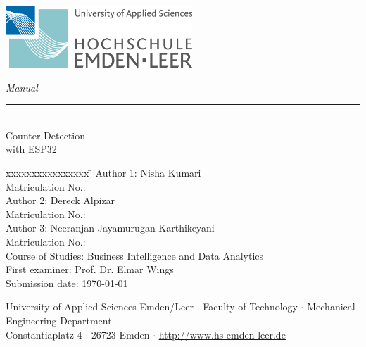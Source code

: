 %
%

\begin{titlepage}
    
    \begin{flushleft} 
        \includegraphics[width=7cm]{General/HS_EmdenLeer_Logo.png}
    \end{flushleft} 
    
    \begin{flushright}
        \vspace{2cm}
        \LARGE \textsl{Manual}\\
        \rule{0.6\textwidth}{0.4pt} ~\\
        \vspace{0.5cm}
        \textsf{\LARGE Counter Detection}\\
        \textsf{\LARGE with ESP32}
    \end{flushright}
    
    \vspace{2cm}
    \large
    \begin{tabbing}
	xxxxxxxxxxxxxxxx \= \kill
	Author 1: \> Nisha Kumari \\
	Matriculation No.:  \\
	Author 2: \> Dereck Alpizar \\
	Matriculation No.:  \\
	Author 3: \> Neeranjan Jayamurugan Karthikeyani \\
	Matriculation No.:  \\
	Course of Studies: \> Business Intelligence and Data Analytics \\ [0.5cm]
	First examiner: \> Prof. Dr. Elmar Wings \\
        Submission date: \> \today \\
    \end{tabbing}
    
    \vspace{2cm}
    \small
    \begin{center}
        University of Applied Sciences Emden/Leer $\cdot$ 
        Faculty of Technology $\cdot$ 
        Mechanical Engineering Department \\
        Constantiaplatz 4 $\cdot$ 
        26723 Emden $\cdot$ 
        \url{http://www.hs-emden-leer.de}
    \end{center}
    
\end{titlepage}
